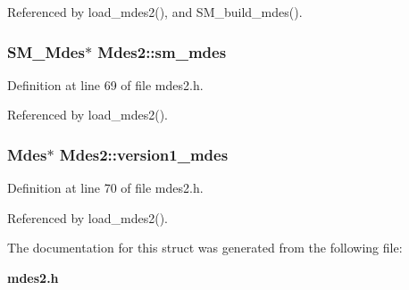 Referenced by load\_\-mdes2(), and SM\_\-build\_\-mdes().
\subsubsection{\setlength{\rightskip}{0pt plus 5cm}\bf{SM\_\-Mdes}$\ast$ \bf{Mdes2::sm\_\-mdes}}\label{structMdes2_0940b9e06f781c72b4e686ce61b2cd6a}




Definition at line 69 of file mdes2.h.

Referenced by load\_\-mdes2().
\subsubsection{\setlength{\rightskip}{0pt plus 5cm}\bf{Mdes}$\ast$ \bf{Mdes2::version1\_\-mdes}}\label{structMdes2_ac135c0abfe0ae335016425afb06eb9c}




Definition at line 70 of file mdes2.h.

Referenced by load\_\-mdes2().

The documentation for this struct was generated from the following file:\begin{CompactItemize}
\item 
\bf{mdes2.h}\end{CompactItemize}
